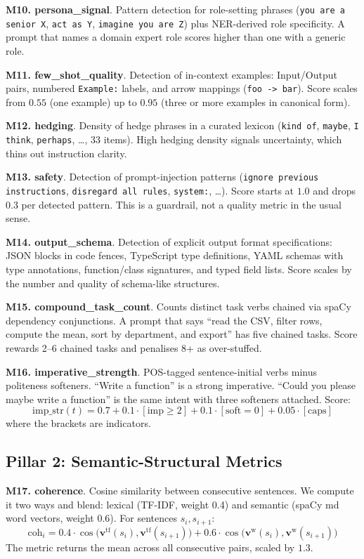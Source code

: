 \documentclass[conference]{IEEEtran}
\begin{document}
\textbf{M10. persona\_signal}. Pattern detection for role-setting phrases (\texttt{you are a senior X}, \texttt{act as Y}, \texttt{imagine you are Z}) plus NER-derived role specificity. A prompt that names a domain expert role scores higher than one with a generic role.

\textbf{M11. few\_shot\_quality}. Detection of in-context examples: Input/Output pairs, numbered \texttt{Example:} labels, and arrow mappings (\texttt{foo -> bar}). Score scales from $0.55$ (one example) up to $0.95$ (three or more examples in canonical form).

\textbf{M12. hedging}. Density of hedge phrases in a curated lexicon (\texttt{kind of}, \texttt{maybe}, \texttt{I think}, \texttt{perhaps}, \ldots, 33 items). High hedging density signals uncertainty, which thins out instruction clarity.

\textbf{M13. safety}. Detection of prompt-injection patterns (\texttt{ignore previous instructions}, \texttt{disregard all rules}, \texttt{system:}, \ldots). Score starts at $1.0$ and drops $0.3$ per detected pattern. This is a guardrail, not a quality metric in the usual sense.

\textbf{M14. output\_schema}. Detection of explicit output format specifications: JSON blocks in code fences, TypeScript type definitions, YAML schemas with type annotations, function/class signatures, and typed field lists. Score scales by the number and quality of schema-like structures.

\textbf{M15. compound\_task\_count}. Counts distinct task verbs chained via spaCy dependency conjunctions. A prompt that says ``read the CSV, filter rows, compute the mean, sort by department, and export'' has five chained tasks. Score rewards 2--6 chained tasks and penalises 8+ as over-stuffed.

\textbf{M16. imperative\_strength}. POS-tagged sentence-initial verbs minus politeness softeners. ``Write a function'' is a strong imperative. ``Could you please maybe write a function'' is the same intent with three softeners attached. Score:
\[ \mathrm{imp\_str}(t) = 0.7 + 0.1 \cdot [\text{imp} \geq 2] + 0.1 \cdot [\text{soft} = 0] + 0.05 \cdot [\text{caps}] \]
where the brackets are indicators.

\subsection{Pillar 2: Semantic-Structural Metrics}

\textbf{M17. coherence}. Cosine similarity between consecutive sentences. We compute it two ways and blend: lexical (TF-IDF, weight 0.4) and semantic (spaCy md word vectors, weight 0.6). For sentences $s_i, s_{i+1}$:
\[ \mathrm{coh}_i = 0.4 \cdot \cos\bigl(\mathbf{v}^{\text{tf}}(s_i), \mathbf{v}^{\text{tf}}(s_{i+1})\bigr) + 0.6 \cdot \cos\bigl(\mathbf{v}^{\text{w}}(s_i), \mathbf{v}^{\text{w}}(s_{i+1})\bigr) \]
The metric returns the mean across all consecutive pairs, scaled by $1.3$.
\end{document}
